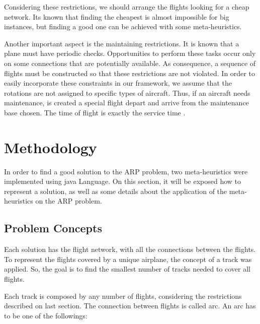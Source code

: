 \documentclass{endm}
\begin{document}
Considering these restrictions, we should arrange the flights looking for a cheap network. Its known that finding the cheapest is almost impossible for big instances, but finding a good one can be achieved with some meta-heuristics.

	Another important aspect is the maintaining restrictions. It is known that a plane must have periodic checks. Opportunities to perform these tasks occur only on some connections that are potentially available. As consequence, a sequence of flights must be constructed so that these restrictions are not violated. In order to easily incorporate these constraints in our framework, we assume that the rotations are not assigned to specific types of aircraft. Thus, if an aircraft needs maintenance, is created a special flight depart and arrive from the maintenance base chosen. The time of flight is exactly the service time \cite{pimentel2005}.

\section{Methodology}

In order to find a good solution to the ARP problem, two meta-heuristics were implemented using java Language. On this section, it will be exposed how to represent a solution, as well as some details about the application of the meta-heuristics on the ARP problem.

\subsection{Problem Concepts}

Each solution has the flight network, with all the connections between the flights. To represent the flights covered by a unique airplane, the concept of a track was applied. So, the goal is to find the smallest number of tracks needed to cover all flights.

	Each track is composed by any number of flights, considering the restrictions described on last section. The connection between flights is called arc. An arc has to be one of the followings:
\end{document}

